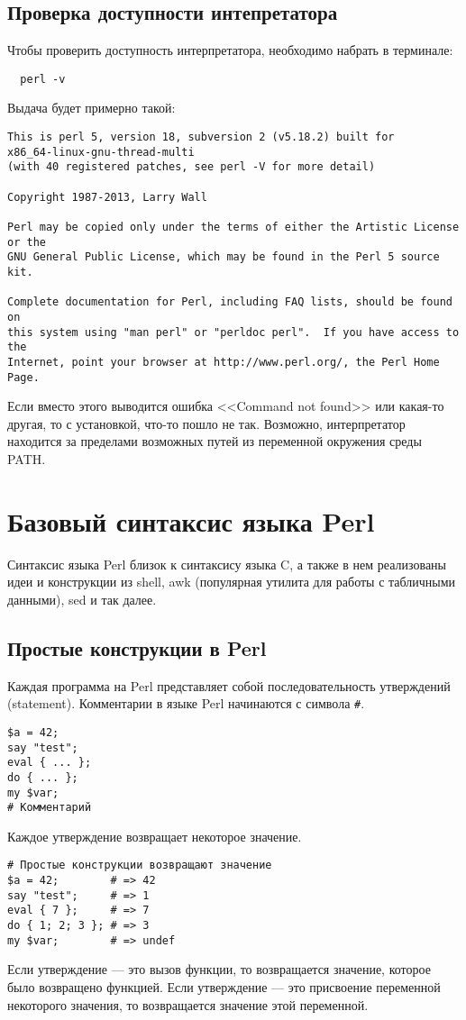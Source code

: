 \subsection{Проверка доступности интепретатора}
Чтобы проверить доступность интерпретатора, необходимо набрать в терминале:
\begin{verbatim}
  perl -v
\end{verbatim}
Выдача будет примерно такой:
\begin{verbatim}
This is perl 5, version 18, subversion 2 (v5.18.2) built for
x86_64-linux-gnu-thread-multi
(with 40 registered patches, see perl -V for more detail)

Copyright 1987-2013, Larry Wall

Perl may be copied only under the terms of either the Artistic License or the
GNU General Public License, which may be found in the Perl 5 source kit.

Complete documentation for Perl, including FAQ lists, should be found on
this system using "man perl" or "perldoc perl".  If you have access to the
Internet, point your browser at http://www.perl.org/, the Perl Home Page.
\end{verbatim}

Если вместо этого выводится ошибка <<Command not found>> или какая-то другая, то с установкой, что-то пошло не так. Возможно, интерпретатор находится за пределами возможных путей из переменной окружения среды PATH.

\section{Базовый синтаксис языка Perl}
Синтаксис языка Perl близок к синтаксису языка C, а также в нем реализованы идеи и конструкции из shell, awk (популярная утилита для работы с табличными данными), sed и так далее.

\subsection{Простые конструкции в Perl}
Каждая программа на Perl представляет собой последовательность утверждений (statement). Комментарии в языке Perl начинаются с символа \verb|#|.
\begin{verbatim}
$a = 42;
say "test";
eval { ... };
do { ... };
my $var;
# Комментарий
\end{verbatim}
Каждое утверждение возвращает некоторое значение.
\begin{verbatim}
# Простые конструкции возвращают значение
$a = 42;        # => 42
say "test";     # => 1
eval { 7 };     # => 7
do { 1; 2; 3 }; # => 3
my $var;        # => undef
\end{verbatim}
Если утверждение --- это вызов функции, то возвращается значение, которое было возвращено функцией. Если утверждение --- это присвоение переменной некоторого значения, то возвращается значение этой переменной.

